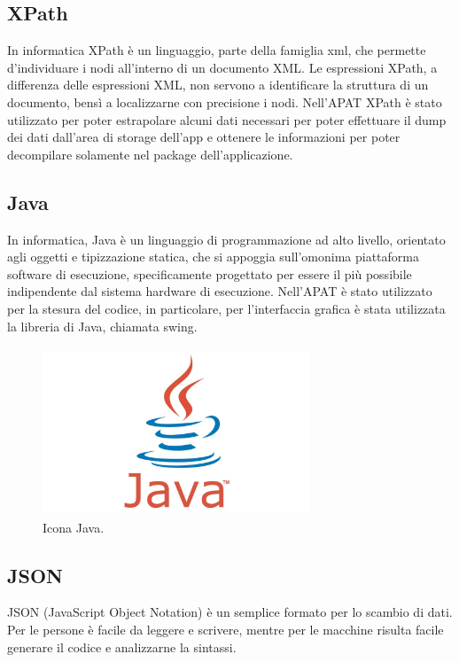 \subsection*{XPath}\label{subsec:xpath}
In informatica XPath è un linguaggio, parte della famiglia \gls{xml}, che permette d'individuare i nodi all'interno di un documento XML. Le espressioni XPath, a differenza delle espressioni XML, non servono a identificare la struttura di un documento, bensì a localizzarne con precisione i nodi.
Nell'APAT XPath è stato utilizzato per poter estrapolare alcuni dati necessari per poter effettuare il dump dei dati dall'area di storage dell'app e ottenere le informazioni per poter decompilare solamente nel package dell'applicazione.

\subsection*{Java}
In informatica, Java\cite{womak:effective-java} è un linguaggio di programmazione ad alto livello, orientato agli oggetti e tipizzazione statica, che si appoggia sull'omonima piattaforma software di esecuzione, specificamente progettato per essere il più possibile indipendente dal sistema hardware di esecuzione.
Nell'APAT è stato utilizzato per la stesura del codice, in particolare, per l'interfaccia grafica è stata utilizzata la libreria di Java, chiamata \gls{swing}.
\begin{figure}[H]
    \centering
    \includegraphics[width=8cm, height=5cm]{./immagini/java.jpg}
    \caption{Icona Java.}\label{fig:java}
\end{figure}

\subsection*{JSON}
JSON (JavaScript Object Notation) è un semplice formato per lo scambio di dati.
Per le persone è facile da leggere e scrivere, mentre per le macchine risulta facile generare il codice e analizzarne la sintassi.

